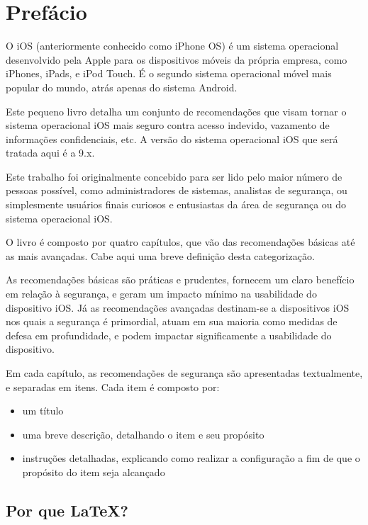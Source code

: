 \chapter*{Pref\'acio}

O iOS (anteriormente conhecido como iPhone OS) \'e um sistema operacional desenvolvido pela Apple para os dispositivos m\'oveis da pr\'opria empresa, como iPhones, iPads, e iPod Touch. \'E o segundo sistema operacional m\'ovel mais popular do mundo, atr\'as apenas do sistema Android. 

Este pequeno livro detalha um conjunto de recomenda\c c\~oes que visam tornar o sistema operacional iOS mais seguro contra acesso indevido, vazamento de informa\c c\~oes confidenciais, etc. A vers\~ao do sistema operacional iOS que ser\'a tratada aqui \'e a 9.x.

Este trabalho foi originalmente concebido para ser lido pelo maior n\'umero de pessoas poss\'ivel, como administradores de sistemas, analistas de seguran\c ca, ou simplesmente usu\'arios finais curiosos e entusiastas da \'area de seguran\c ca ou do sistema operacional iOS.

O livro \'e composto por quatro cap\'itulos, que v\~ao das recomenda\c c\~oes b\'asicas at\'e as mais avan\c cadas. Cabe aqui uma breve defini\c c\~ao desta categoriza\c c\~ao. 

As recomenda\c c\~oes b\'asicas s\~ao pr\'aticas e prudentes, fornecem um claro benef\'icio em rela\c c\~ao \`a seguran\c ca, e geram um impacto m\'inimo na usabilidade do dispositivo iOS. J\'a as recomenda\c c\~oes avan\c cadas destinam-se a dispositivos iOS nos quais a seguran\c ca \'e primordial, atuam em sua maioria como medidas de defesa em profundidade, e podem impactar significamente a usabilidade do dispositivo.

Em cada cap\'itulo, as recomenda\c c\~oes de seguran\c ca s\~ao apresentadas textualmente, e separadas em itens. Cada item \'e composto por:

\begin{itemize}
\item um t\'itulo
\item uma breve descri\c c\~ao, detalhando o item e seu prop\'osito
\item instru\c c\~oes detalhadas, explicando como realizar a configura\c c\~ao a fim de que o prop\'osito do item seja alcan\c cado
\end{itemize}

\section*{Por que \LaTeX?}

